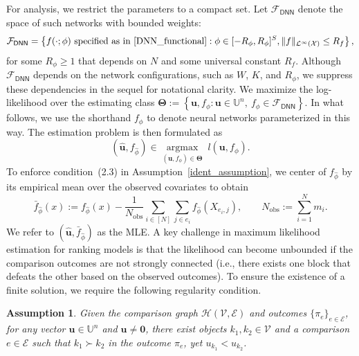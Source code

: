 \documentclass[
  12pt]{article}
\newtheorem{assumption}{Assumption}
\begin{document}
For analysis, we restrict the parameters to a compact set. Let $\mathcal{F}_{\mathsf{DNN}}$ denote the space of such networks with bounded weights:
$$\mathcal{F}_{\mathsf{DNN}} = \left\{ f(\cdot; \phi) \text{ specified as in } \eqref{DNN_functional}: \phi \in [-R_\phi, R_\phi]^S , \|f\|_{\mathcal{L}^\infty(\mathcal{X})}\leq R_f\right\}, $$
{for some $R_\phi \geq 1$ that depends on $N$ and some universal constant $R_f$.} 
Although $\mathcal{F}_{\mathsf{DNN}}$ depends on the network configurations, such as $W$, $K$, and $R_\phi$, we suppress these dependencies in the sequel for notational clarity. We maximize the log-likelihood over the estimating class $\boldsymbol{\Theta} := \left\{ \boldsymbol{u}, f_\phi : \boldsymbol{u} \in \mathbb{U}^n, \ f_\phi \in \mathcal{F}_{\mathsf{DNN}} \right\}$.
\noindent In what follows, we use the shorthand $f_\phi$ to denote neural networks parameterized in this way. The estimation problem is then formulated as
\begin{equation}
\label{mle}
(\widehat{\boldsymbol{u}}, f_{\widehat{\phi}}) \in \underset{(\boldsymbol{u}, f_\phi) \in \boldsymbol{\Theta}}{\operatorname{argmax}} \; l(\boldsymbol{u}, f_\phi).
\end{equation}
To enforce condition~(2.3) in Assumption~\ref{ident_assumption}, we center of $f_{\widehat{\phi}}$ by its empirical mean over the observed covariates to obtain
\begin{equation}\label{dnn_centering}
\bar{f}_{\widehat{\phi}}(x):=f_{\widehat{\phi}}(x)-\frac{1}{N_{\operatorname{obs}}}\sum_{i\in [N]}\sum_{j\in e_i}f_{\widehat{\phi}}(X_{e_i,j}), \quad\quad N_{\operatorname{obs}}:=\sum_{i=1}^N m_i.\end{equation}
We refer to $(\widehat{\boldsymbol{u}}, \bar{f}_{\widehat{\phi}})$ as the MLE. A key challenge in maximum likelihood estimation for ranking models is that the likelihood can become unbounded if the comparison outcomes are not strongly connected (i.e., there exists one block that defeats the other based on the observed outcomes). To ensure the existence of a finite solution, we require the following regularity condition.

\begin{assumption}
\label{both_win_lose}
Given the comparison graph $\mathcal{H} (\mathcal{V}, \mathcal{E})$ and outcomes $\{\pi_e\}_{e \in \mathcal{E}}$, for any vector $\boldsymbol{u} \in \mathbb{U}^n$ and $\boldsymbol{u}\neq \boldsymbol{0}$, there exist objects $k_1, k_2 \in \mathcal{V}$ and a comparison $e \in \mathcal{E}$ such that $k_1 \succ k_2$ in the outcome $\pi_e$, yet $u_{k_1} < u_{k_2}$.
\end{assumption}
\end{document}
